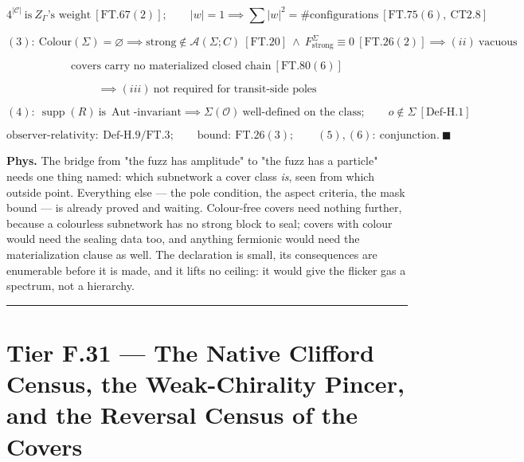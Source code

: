 \begin{theorem}
\[
4^{|\mathcal C|}\ \text{is}\ Z_\Gamma\text{'s weight}\ [\mathrm{FT.67}(2)];\qquad|w|=1\implies\sum|w|^2=\#\text{configurations}\ [\mathrm{FT.75}(6),\ \mathrm{CT2.8}]
\]

\[
(3):\ \mathrm{Colour}(\Sigma)=\varnothing\implies\text{strong}\notin\mathcal A(\Sigma;C)\ [\mathrm{FT.20}]\ \wedge\ F^{\Sigma}_{\mathrm{strong}}\equiv0\ [\mathrm{FT.26}(2)]\implies(ii)\ \text{vacuous}
\]

\[
\text{covers carry no materialized closed chain}\ [\mathrm{FT.80}(6)]
\]

\[
\implies (iii)\ \text{not required for transit-side poles}
\]

\[
(4):\ \operatorname{supp}(R)\ \text{is}\ \operatorname{Aut}\text{-invariant}\implies\Sigma(\mathcal O)\ \text{well-defined on the class};\qquad o\notin\Sigma\ [\mathrm{Def\text{-}H.1}]
\]

\[
\text{observer-relativity}:\ \mathrm{Def\text{-}H.9}/\mathrm{FT.3};\qquad\text{bound}:\ \mathrm{FT.26}(3);\qquad(5),(6):\ \text{conjunction}.\ \blacksquare
\]

\textbf{Phys.} The bridge from "the fuzz has amplitude" to "the fuzz has a particle" needs one thing named: which subnetwork a cover class \textit{is}, seen from which outside point. Everything else — the pole condition, the aspect criteria, the mask bound — is already proved and waiting. Colour-free covers need nothing further, because a colourless subnetwork has no strong block to seal; covers with colour would need the sealing data too, and anything fermionic would need the materialization clause as well. The declaration is small, its consequences are enumerable before it is made, and it lifts no ceiling: it would give the flicker gas a spectrum, not a hierarchy.

\vspace{2pt}\noindent\rule{\textwidth}{0.4pt}\vspace{2pt}

\end{theorem}

\section[Tier F.31 — The Native Clifford Census, the Weak-Chirality…]{\texorpdfstring{Tier F.31 — The Native Clifford Census, the Weak-Chirality Pincer, and the Reversal Census of the Covers}{Tier F.31 - The Native Clifford Census, the Weak-Chirality Pincer, and the Reversal Census of the Covers}}

